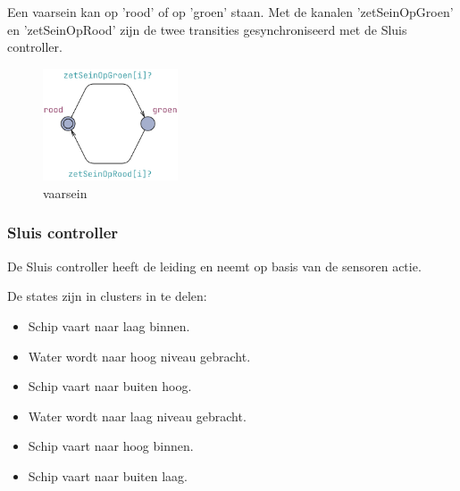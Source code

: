 \documentclass{article} %
\begin{document}
Een vaarsein kan op 'rood' of op 'groen' staan. Met de kanalen 'zetSeinOpGroen' en 'zetSeinOpRood' zijn de twee transities gesynchroniseerd met de Sluis controller.

\begin{figure}[h]
\includegraphics[width=4cm]{vaarsein.png}
\centering    
\caption{vaarsein}
\end{figure}

\newpage

\subsubsection{Sluis controller}

De Sluis controller heeft de leiding en neemt op basis van de sensoren actie.

De states zijn in clusters in te delen:

\begin{itemize}
    \item Schip vaart naar laag binnen.
    \item Water wordt naar hoog niveau gebracht.
    \item Schip vaart naar buiten hoog.
    \item Water wordt naar laag niveau gebracht.
    \item Schip vaart naar hoog binnen.
    \item Schip vaart naar buiten laag.
\end{itemize}
\end{document}
